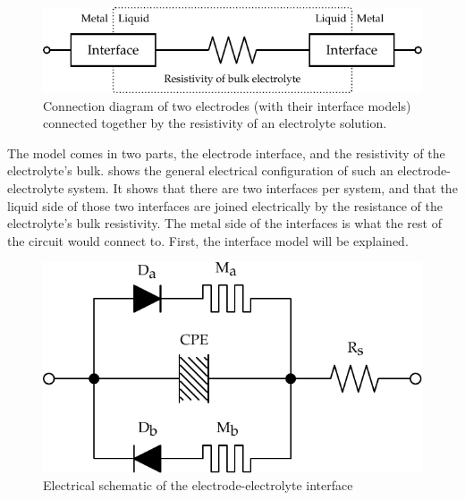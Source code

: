   \begin{figure}
    \centering
    \includegraphics{content/pt2/07-InterfaceModel/graphics/simpleElectrodeElectrolyteModel}
    \caption{\label{fig:pt2-simpleElectrodeElectrolyteModel}Connection diagram of two electrodes (with their interface models) connected together by the resistivity of an electrolyte solution.}
  \end{figure}
  The model comes in two parts, the electrode interface, and the resistivity of the electrolyte's bulk.
   shows the general electrical configuration of such an electrode-electrolyte system.
  It shows that there are two interfaces per system, and that the liquid side of those two interfaces are joined electrically by the resistance of the electrolyte's bulk resistivity.
  The metal side of the interfaces is what the rest of the circuit would connect to.
  First, the interface model will be explained.



  \begin{figure}
    \centering
    \includegraphics{content/pt2/07-InterfaceModel/graphics/interfaceSchematic}
    \caption{\label{fig:pt2-interfaceSchematic}Electrical schematic of the electrode-electrolyte interface}
  \end{figure}


